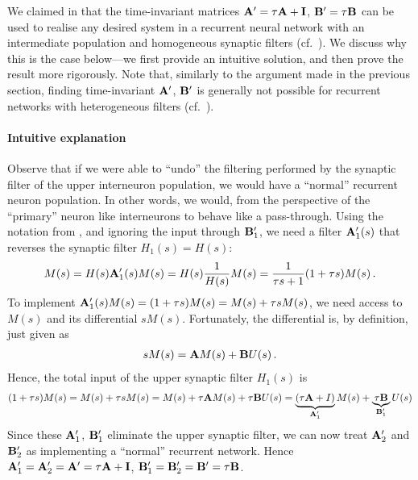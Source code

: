 We claimed in  that the time-invariant matrices $\mathbf{A}' = \tau \mathbf{A} + \mathbf{I}$, $\mathbf{B}' = \tau \mathbf{B}$ can be used to realise any desired \LTI system in a recurrent neural network with an intermediate population and homogeneous synaptic filters (cf.~).
We discuss why this is the case below---we first provide an intuitive solution, and then prove the result more rigorously.
Note that, similarly to the argument made in the previous section, finding time-invariant $\mathbf{A}'$, $\mathbf{B}'$ is generally not possible for recurrent networks with heterogeneous filters (cf.~).

\paragraph{Intuitive explanation}
Observe that if we were able to \enquote{undo} the filtering performed by the synaptic filter of the upper interneuron population, we would have a \enquote{normal} recurrent neuron population. In other words, we would, from the perspective of the \enquote{primary} neuron like interneurons to behave like a pass-through.
Using the notation from , and ignoring the input through $\mathbf{B}_1'$, we need a filter $\mathbf{A}'_1(s)$ that reverses the synaptic filter $H_1(s) = H(s)$:
\begin{align*}
	M(s) = H(s) \mathbf{A}'_1(s) M(s) = H(s) \frac{1}{H(s)} M(s) = \frac{1}{\tau s + 1} (1 + \tau s) M(s) \,.
\end{align*}
To implement $\mathbf{A}'_1(s) M(s) = (1 + \tau s) M(s) =  M(s) + \tau s M(s)$, we need access to $M(s)$ and its differential $s M(s)$. Fortunately, the differential is, by definition, just given as
\begin{align*}
	s M(s) = \mathbf{A} M(s) + \mathbf{B} U(s) \,.
\end{align*}
Hence, the total input of the upper synaptic filter $H_1(s)$ is
\begin{align*}
	(1 + \tau s) M(s) = M(s) + \tau s M(s) = M(s) + \tau \mathbf{A} M(s) + \tau \mathbf{B} U(s) = \underbrace{(\tau \mathbf{A} + I)}_{\mathbf{A}_1'} M(s) + \underbrace{\tau \mathbf{B}}_{\mathbf{B}_1'} U(s)
\end{align*}
Since these $\mathbf{A}_1'$, $\mathbf{B}_1'$ eliminate the upper synaptic filter, we can now treat $\mathbf{A}'_2$ and $\mathbf{B}_2'$ as implementing a \enquote{normal} recurrent \NEF network.
Hence $\mathbf{A}_1' = \mathbf{A}_2' = \mathbf{A}' = \tau \mathbf{A} + \mathbf{I}$, $\mathbf{B}_1' = \mathbf{B}_2' = \mathbf{B}' = \tau \mathbf{B}$.


